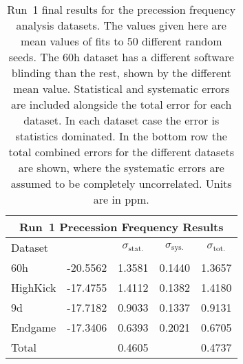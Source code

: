 \begin{table}
\centering
\renewcommand{\arraystretch}{1.2}
\begin{tabular*}{\linewidth}{@{\extracolsep{\fill}}lcccc}
  \hline
    \multicolumn{5}{c}{\textbf{Run~1 Precession Frequency Results}} \\
  \hline\hline
    Dataset & \multicolumn{1}{c}{\R} & \multicolumn{1}{c}{$\sigma_{\text{stat.}}$} & \multicolumn{1}{c}{$\sigma_{\text{sys.}}$} & \multicolumn{1}{c}{$\sigma_{\text{tot.}}$} \\ 
  \hline
    60h & -20.5562 & 1.3581 & 0.1440 & 1.3657 \\
    HighKick & -17.4755 & 1.4112 & 0.1382 & 1.4180 \\
    9d & -17.7182 & 0.9033 & 0.1337 & 0.9131 \\
    Endgame & -17.3406 & 0.6393 & 0.2021 & 0.6705 \\
  \hline
  Total & & 0.4605 & & 0.4737 \\
  \hline
\end{tabular*}
\caption[Run~1 final results]{Run~1 final results for the precession frequency analysis datasets. The \R values given here are mean values of fits to 50 different random seeds. The 60h dataset has a different software blinding than the rest, shown by the different mean \R value. Statistical and systematic errors are included alongside the total error for each dataset. In each dataset case the error is statistics dominated. In the bottom row the total combined errors for the different datasets are shown, where the systematic errors are assumed to be completely uncorrelated. Units are in ppm.}
\label{tab:FinalResults}
\end{table}






